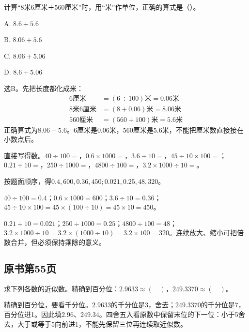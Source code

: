 计算“8米6厘米＋560厘米”时，用“米”作单位，正确的算式是（\hspace{1.8em}）。\par
\noindent A. \(8.6+5.6\)\par
\noindent B. \(8.06+5.6\)\par
\noindent C. \(8.06+5.06\)\par
\noindent D. \(8.6+5.06\)\par
\begin{BookAnswer}
选B。先把长度都化成米：\[\begin{aligned}6\text{厘米}&=(6\div100)\text{米}=0.06\text{米}\\8\text{米}6\text{厘米}&=(8+0.06)\text{米}=8.06\text{米}\\560\text{厘米}&=(560\div100)\text{米}=5.6\text{米}\end{aligned}\]正确算式为\(8.06+5.6\)。6厘米是0.06米，560厘米是5.6米，不能把厘米数直接接在小数点后。
\end{BookAnswer}

直接写得数。\(40\div100=\)，\allowbreak{}\(0.6\times1000=\)，\allowbreak{}\(3.6\div10=\)，\allowbreak{}\(45\div10\times100=\)；\allowbreak{}\(0.21\div10=\)，\allowbreak{}\(250\div1000=\)，\allowbreak{}\(4800\div100=\)，\allowbreak{}\(3.2\times1000\div10=\)。\par
\begin{BookAnswer}
按题面顺序，得\(0.4,600,0.36,450;0.021,0.25,48,320\)。\par \(40\div100=0.4\)；\allowbreak{}\(0.6\times1000=600\)；\allowbreak{}\(3.6\div10=0.36\)；\allowbreak{}\(45\div10\times100=45\times(100\div10)=45\times10=450\)。\par \(0.21\div10=0.021\)；\allowbreak{}\(250\div1000=0.25\)；\allowbreak{}\(4800\div100=48\)；\allowbreak{}\(3.2\times1000\div10=3.2\times(1000\div10)=3.2\times100=320\)。连续放大、缩小可把倍数合并，但必须保持乘除的意义。
\end{BookAnswer}



\subsection*{原书第55页}

求下列各数的近似数。精确到百分位：\(2.9633\approx(\quad)\)，\allowbreak{}\(249.3370\approx(\quad)\)。\par
\begin{BookAnswer}
精确到百分位，要看千分位。\(2.9633\)的千分位是3，舍去；\allowbreak{}\(249.3370\)的千分位是7，百分位进1。因此填\(2.96\)、\(249.34\)。四舍五入看原数中保留末位的下一位：小于5舍去，大于或等于5向前进1，不能先保留三位再连续取近似数。
\end{BookAnswer}


